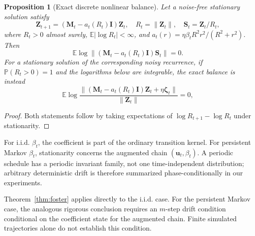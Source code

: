 \documentclass[11pt]{article}
\newtheorem{proposition}[theorem]{Proposition}
\theoremstyle{definition}
\newcommand{\E}{\mathbb E}
\newcommand{\Pp}{\mathbb P}
\newcommand{\Id}{\mathbf I}
\begin{document}
\begin{proposition}[Exact discrete nonlinear balance]
\label{prop:nonlinear-balance}
Let a noise-free stationary solution satisfy
\begin{equation}
 \mathbf Z_{t+1}
 =\left(\mathbf M_t-a_t(R_t)\Id\right)\mathbf Z_t,
 \quad R_t=\|\mathbf Z_t\|,\quad
 \mathbf S_t=\mathbf Z_t/R_t,
 \label{eq:noise-free-balance-map}
\end{equation}
where $R_t>0$ almost surely, $\E|\log R_t|<\infty$, and
$a_t(r)=\eta\beta_tR^2r^2/(R^2+r^2)$.  Then
\begin{equation}
 \E\log\left\|
   (\mathbf M_t-a_t(R_t)\Id)\mathbf S_t
 \right\|=0.
 \label{eq:nonlinear-balance}
\end{equation}
For a stationary solution of the corresponding noisy recurrence, if
$\Pp(R_t>0)=1$ and the logarithms below are integrable, the exact balance is
instead
\begin{equation}
 \E\log\frac{\|(
 \mathbf M_t-a_t(R_t)\Id)\mathbf Z_t+\eta\boldsymbol\zeta_t\|}
 {\|\mathbf Z_t\|}=0,
 \label{eq:noisy-nonlinear-balance}
\end{equation}
\end{proposition}

\begin{proof}
Both statements follow by taking expectations of
$\log R_{t+1}-\log R_t$ under stationarity.
\end{proof}

For i.i.d. $\beta_t$, the coefficient is part of the ordinary transition
kernel.  For persistent Markov $\beta_t$, stationarity concerns the augmented
chain $(\mathbf u_t,\beta_t)$.  A periodic schedule has a periodic invariant
family, not one time-independent distribution; arbitrary deterministic drift
is therefore summarized phase-conditionally in our experiments.

Theorem~\ref{thm:foster} applies directly to the i.i.d. case.  For the
persistent Markov case, the analogous rigorous conclusion requires an
$m$-step drift condition conditional on the coefficient state for the
augmented chain.  Finite simulated trajectories alone do not establish this
condition.
\end{document}
